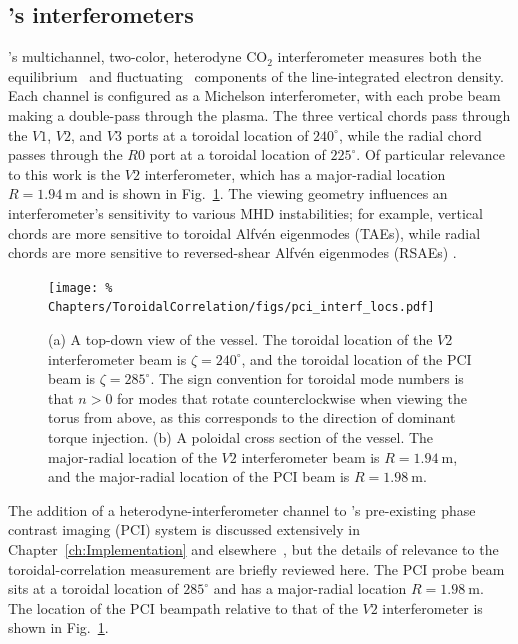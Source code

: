\subsection{\diiid's interferometers}
\label{sec:ToroidalCorrelation:Interferometers:diiid}
\diiid's multichannel, two-color, heterodyne CO$_2$ interferometer
measures both the equilibrium~\cite{carlstrom_rsi88} and
fluctuating~\cite{vanzeeland_ppcf05, pace_nf17} components
of the line-integrated electron density.
Each channel is configured as a Michelson interferometer,
with each probe beam making a double-pass through the plasma.
The three vertical chords pass through the $V1$, $V2$, and $V3$ ports
at a toroidal location of $240^{\circ}$, while
the radial chord passes through the $R0$ port
at a toroidal location of $225^{\circ}$.
Of particular relevance to this work is the $V2$ interferometer,
which has a major-radial location $R = \SI{1.94}{\meter}$ and
is shown in Fig.~\ref{fig:ToroidalCorrelation:pci_interf_locs}.
The viewing geometry influences
an interferometer's sensitivity to various MHD instabilities;
for example, vertical chords are more sensitive to
toroidal Alfv\'{e}n eigenmodes (TAEs), while
radial chords are more sensitive to
reversed-shear Alfv\'{e}n eigenmodes (RSAEs)
\cite{vanzeeland_ppcf05}.

\begin{figure}
  \centering
  \texttt{[image: \%
    Chapters/ToroidalCorrelation/figs/pci\_interf\_locs.pdf]}
  \caption[Locations of the $V2$ and PCI interferometer beams on \diiid]{%
    (a) A top-down view of the \diiid\space vessel.
    The toroidal location of the $V2$ interferometer beam
    is $\zeta = 240^{\circ}$,
    and the toroidal location of the PCI beam
    is $\zeta = 285^{\circ}$.
    The \diiid\space sign convention for toroidal mode numbers
    is that $n > 0$ for modes that rotate counterclockwise
    when viewing the torus from above,
    as this corresponds to the direction of dominant torque injection.
    (b) A poloidal cross section of the \diiid\space vessel.
    The major-radial location of the $V2$ interferometer beam
    is $R = \SI{1.94}{\meter}$, and
    the major-radial location of the PCI beam
    is $R = \SI{1.98}{\meter}$.}
\label{fig:ToroidalCorrelation:pci_interf_locs}
\end{figure}

The addition of a heterodyne-interferometer channel
to \diiid's pre-existing phase contrast imaging (PCI) system
is discussed extensively in
Chapter~\ref{ch:Implementation} and
elsewhere~\cite{davis_rsi16}, but
the details of relevance to the toroidal-correlation measurement
are briefly reviewed here.
The PCI probe beam sits at a toroidal location of $285^{\circ}$ and
has a major-radial location $R = \SI{1.98}{\meter}$.
The location of the PCI beampath relative to that of the $V2$ interferometer
is shown in Fig.~\ref{fig:ToroidalCorrelation:pci_interf_locs}.

